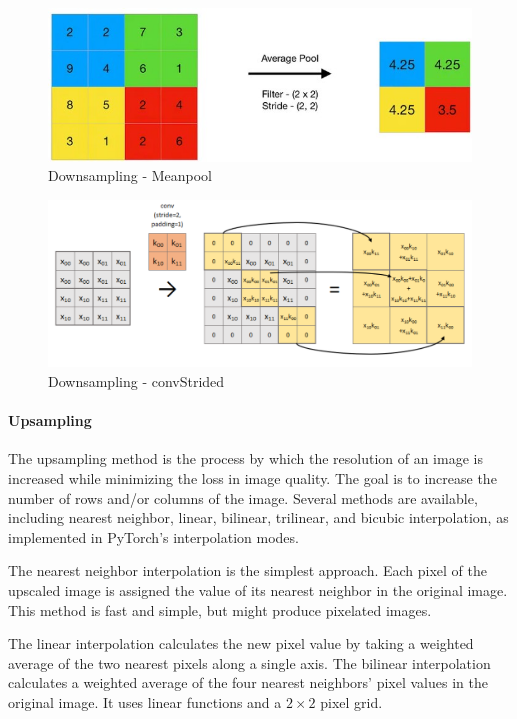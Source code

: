 \documentclass[twocolumn]{article}
\begin{document}
\begin{figure}
    \centering
    \includegraphics[width=1\linewidth]{Meanpool.jpg}
    \caption{Downsampling - Meanpool}
    \label{fig:meanpool}
\end{figure}

\begin{figure}
    \centering
    \includegraphics[width=1\linewidth]{ConvStrided_new.png}
    \caption{Downsampling - convStrided}
    \label{fig:convStrided}
\end{figure}


\paragraph{Upsampling}
The upsampling method is the process by which the resolution of an image is increased while minimizing the loss in image quality. 
The goal is to increase the number of rows and/or columns of the image. 
Several methods are available, including nearest neighbor, linear, bilinear, trilinear, and bicubic interpolation, as implemented in PyTorch's interpolation modes.

The nearest neighbor interpolation is the simplest approach. 
Each pixel of the upscaled image is assigned the value of its nearest neighbor in the original image. 
This method is fast and simple, but might produce pixelated images.

The linear interpolation calculates the new pixel value by taking a weighted average of the two nearest pixels along a single axis. 
The bilinear interpolation calculates a weighted average of the four nearest neighbors' pixel values in the original image. 
It uses linear functions and a $2 \times 2$ pixel grid. 
\end{document}
